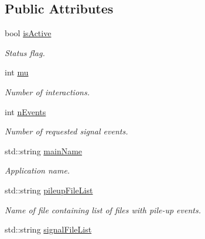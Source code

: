 \subsection*{Public Attributes}
\begin{CompactItemize}
\item 
\hypertarget{classConfiguration_1_1ConfigData_662e9cb502da27792e201f2a75de1a32}{
bool \hyperlink{classConfiguration_1_1ConfigData_662e9cb502da27792e201f2a75de1a32}{is\-Active}}
\label{classConfiguration_1_1ConfigData_662e9cb502da27792e201f2a75de1a32}

\begin{CompactList}\small\item\em Status flag. \item\end{CompactList}\item 
\hypertarget{classConfiguration_1_1ConfigData_f8ae35f3d307fe427416f50d0f9d8295}{
int \hyperlink{classConfiguration_1_1ConfigData_f8ae35f3d307fe427416f50d0f9d8295}{mu}}
\label{classConfiguration_1_1ConfigData_f8ae35f3d307fe427416f50d0f9d8295}

\begin{CompactList}\small\item\em Number of interactions. \item\end{CompactList}\item 
int \hyperlink{classConfiguration_1_1ConfigData_6b90b096ac0ef76c732cfb9ac3b59a1c}{n\-Events}
\begin{CompactList}\small\item\em Number of requested signal events. \item\end{CompactList}\item 
std::string \hyperlink{classConfiguration_1_1ConfigData_c85dc7aae623ecb7e728e582756d920f}{main\-Name}
\begin{CompactList}\small\item\em Application name. \item\end{CompactList}\item 
\hypertarget{classConfiguration_1_1ConfigData_f5c60eaba1d3bd239d1d306f9eeefbe9}{
std::string \hyperlink{classConfiguration_1_1ConfigData_f5c60eaba1d3bd239d1d306f9eeefbe9}{pileup\-File\-List}}
\label{classConfiguration_1_1ConfigData_f5c60eaba1d3bd239d1d306f9eeefbe9}

\begin{CompactList}\small\item\em Name of file containing list of files with pile-up events. \item\end{CompactList}\item 
\hypertarget{classConfiguration_1_1ConfigData_2b263dd4b7d13109e5103d240465f826}{
std::string \hyperlink{classConfiguration_1_1ConfigData_2b263dd4b7d13109e5103d240465f826}{signal\-File\-List}}
\label{classConfiguration_1_1ConfigData_2b263dd4b7d13109e5103d240465f826}


\end{CompactItemize}
